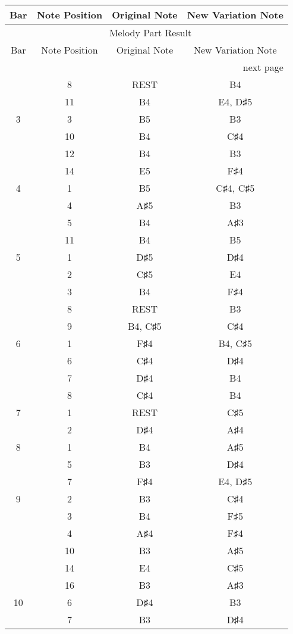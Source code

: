 \documentclass{article}
\begin{document}
\begin{longtable}{|c|c|c|c|}
\hline
Bar & Note Position & Original Note & New Variation Note \\ \hline
\endfirsthead
\multicolumn{4}{c}{{\tablename\ \thetable{} Melody Part Result}} \\
\hline
Bar & Note Position & Original Note & New Variation Note \\ \hline
\hline
\endhead
\hline
\multicolumn{4}{r}{next page}
\endfoot
\hline
\endlastfoot
\hline
2 & 4 & A♯5 & D♯5 \\ 
  & 8 & REST & B4 \\ 
  & 11 & B4 & E4, D♯5 \\ 
\hline
3 & 3 & B5 & B3 \\ 
  & 10 & B4 & C♯4 \\ 
  & 12 & B4 & B3 \\ 
  & 14 & E5 & F♯4 \\ 
\hline
4 & 1 & B5 & C♯4, C♯5 \\ 
  & 4 & A♯5 & B3 \\ 
  & 5 & B4 & A♯3 \\ 
  & 11 & B4 & B5 \\ 
\hline
5 & 1 & D♯5 & D♯4 \\ 
  & 2 & C♯5 & E4 \\ 
  & 3 & B4 & F♯4 \\ 
  & 8 & REST & B3 \\ 
  & 9 & B4, C♯5 & C♯4 \\ 
\hline
6 & 1 & F♯4 & B4, C♯5 \\ 
  & 6 & C♯4 & D♯4 \\ 
  & 7 & D♯4 & B4 \\ 
  & 8 & C♯4 & B4 \\ 
\hline
7 & 1 & REST & C♯5 \\ 
  & 2 & D♯4 & A♯4 \\ 
\hline
8 & 1 & B4 & A♯5 \\ 
  & 5 & B3 & D♯4 \\ 
  & 7 & F♯4 & E4, D♯5 \\ 
\hline
9 & 2 & B3 & C♯4 \\ 
  & 3 & B4 & F♯5 \\ 
  & 4 & A♯4 & F♯4 \\ 
  & 10 & B3 & A♯5 \\ 
  & 14 & E4 & C♯5 \\ 
  & 16 & B3 & A♯3 \\ 
\hline
10 & 6 & D♯4 & B3 \\ 
  & 7 & B3 & D♯4 \\ 

\end{longtable}
\end{document}
